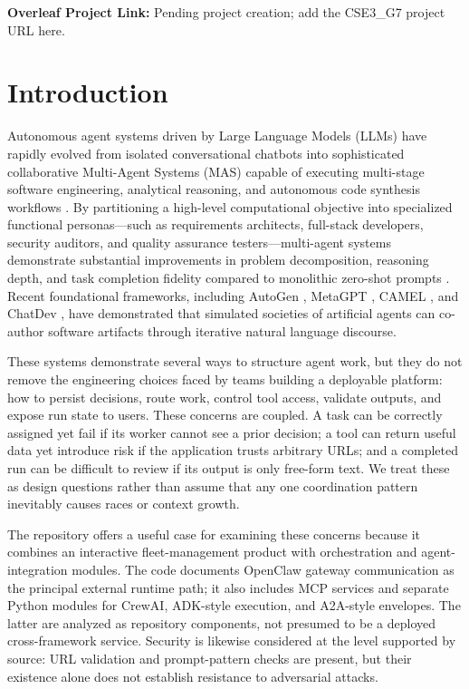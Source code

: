 \documentclass[12pt,onecolumn,draftclsnofoot]{IEEEtran}
\begin{document}
\noindent\textbf{Overleaf Project Link:} Pending project creation; add the CSE3\_G7 project URL here.

\section{Introduction}
Autonomous agent systems driven by Large Language Models (LLMs) have rapidly evolved from isolated conversational chatbots into sophisticated collaborative Multi-Agent Systems (MAS) capable of executing multi-stage software engineering, analytical reasoning, and autonomous code synthesis workflows \cite{wang2024survey, xi2023rise, wooldridge2009introduction}. By partitioning a high-level computational objective into specialized functional personas---such as requirements architects, full-stack developers, security auditors, and quality assurance testers---multi-agent systems demonstrate substantial improvements in problem decomposition, reasoning depth, and task completion fidelity compared to monolithic zero-shot prompts \cite{hong2024metagpt, wu2023autogen}. Recent foundational frameworks, including AutoGen \cite{wu2023autogen}, MetaGPT \cite{hong2024metagpt}, CAMEL \cite{li2023camel}, and ChatDev \cite{qian2024communicative}, have demonstrated that simulated societies of artificial agents can co-author software artifacts through iterative natural language discourse.

These systems demonstrate several ways to structure agent work, but they do not remove the engineering choices faced by teams building a deployable platform: how to persist decisions, route work, control tool access, validate outputs, and expose run state to users. These concerns are coupled. A task can be correctly assigned yet fail if its worker cannot see a prior decision; a tool can return useful data yet introduce risk if the application trusts arbitrary URLs; and a completed run can be difficult to review if its output is only free-form text. We treat these as design questions rather than assume that any one coordination pattern inevitably causes races or context growth.

The repository offers a useful case for examining these concerns because it combines an interactive fleet-management product with orchestration and agent-integration modules. The code documents OpenClaw gateway communication as the principal external runtime path; it also includes MCP services and separate Python modules for CrewAI, ADK-style execution, and A2A-style envelopes. The latter are analyzed as repository components, not presumed to be a deployed cross-framework service. Security is likewise considered at the level supported by source: URL validation and prompt-pattern checks are present, but their existence alone does not establish resistance to adversarial attacks.
\end{document}
